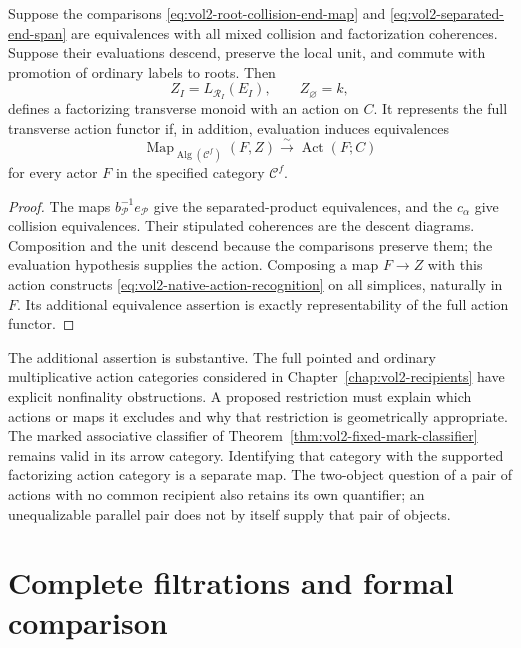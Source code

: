 \begin{theorem}
\label{thm:vol2-factorizing-recognition}
Suppose the comparisons
\eqref{eq:vol2-root-collision-end-map} and
\eqref{eq:vol2-separated-end-span} are equivalences with all
mixed collision and factorization coherences. Suppose their
evaluations descend, preserve the local unit, and commute
with promotion of ordinary labels to roots. Then
\[
 Z_I=L_{\mathscr R_I}(E_I),\qquad Z_\varnothing=k,
\]
defines a factorizing transverse monoid with an action on \(C\).
It represents the full transverse action functor if, in
addition, evaluation induces equivalences
\begin{equation}\label{eq:vol2-native-action-recognition}
 \operatorname{Map}_{\operatorname{Alg}(\mathcal C^f)}(F,Z)
       \xrightarrow{\sim}\operatorname{Act}(F;C)
\end{equation}
for every actor \(F\) in the specified category
\(\mathcal C^f\).
\end{theorem}
\begin{proof}
The maps \(b_{\mathcal P}^{-1}e_{\mathcal P}\) give the
separated-product equivalences, and the \(c_\alpha\) give
collision equivalences. Their stipulated coherences are the
descent diagrams. Composition and the unit descend because
the comparisons preserve them; the evaluation hypothesis
supplies the action. Composing a map \(F\to Z\) with this
action constructs \eqref{eq:vol2-native-action-recognition}
on all simplices, naturally in \(F\). Its additional
equivalence assertion is exactly representability of the
full action functor.
\end{proof}

The additional assertion is substantive. The full pointed
and ordinary multiplicative action categories considered in
Chapter~\ref{chap:vol2-recipients} have explicit
nonfinality obstructions. A proposed restriction must explain
which actions or maps it excludes and why that restriction is
geometrically appropriate. The marked associative classifier
of Theorem~\ref{thm:vol2-fixed-mark-classifier} remains valid
in its arrow category. Identifying that category with the
supported factorizing action category is a separate map.
The two-object question of a pair of actions with no common
recipient also retains its own quantifier; an unequalizable
parallel pair does not by itself supply that pair of objects.

\section{Complete filtrations and formal comparison}
\label{sec:vol2-complete-comparison}

